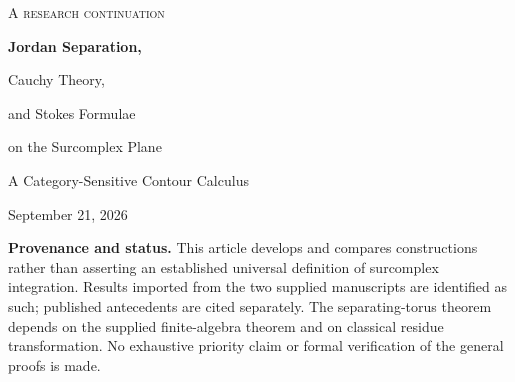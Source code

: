 \documentclass[11pt,letterpaper]{article}
\theoremstyle{definition}
\theoremstyle{remark}
\numberwithin{equation}{section}
\begin{document}
\begin{titlepage}
\centering
\vspace*{0.6cm}
{\Large\scshape A research continuation\par}
\vspace{0.65cm}
{\Huge\bfseries Jordan Separation,\par Cauchy Theory,\par and Stokes Formulae\par}
\vspace{0.35cm}
{\LARGE on the Surcomplex Plane\par}
\vspace{0.55cm}
{\Large A Category-Sensitive Contour Calculus\par}
\vspace{0.6cm}
{\large September 21, 2026\par}
\vspace{0.45cm}
\begin{minipage}{0.94\textwidth}
\begin{abstract}
There is no single surcomplex analogue of the Jordan--Cauchy--Stokes package independent of the chosen topology, function algebra, and class of integration chains. The full fine topology admits no nonconstant continuous ordinary real-parameter paths. Nevertheless, ordinary shadow topology and definable topology give two precise separation theorems; Hahn-coherent differential forms give an exact generalized Stokes theorem; and positive-support deformations give nonstandard contours with integer winding and homotopy-invariant periods.

We extend the supplied manuscripts in a more local direction as well. An infinitesimal rescaling converts radius-free Hahn analytic germs into common-domain polynomial-coefficient families. This yields microscopic Cauchy and residue formulae. Combining the supplied finite-algebra deformation theorem with classical residue transformation, we realize its multidimensional residues by explicit separating product tori, even when the original coefficient germs share no ordinary neighborhood. Rational differential forms additionally admit an algebraic period theory on semialgebraic cycles at arbitrary surreal scales. We compare these constructions with definable, Berkovich, perfectoid, $p$-adic, and resurgent integration, keeping their different hypotheses and target objects explicit.
\end{abstract}
\end{minipage}
\vfill
\begin{minipage}{0.94\textwidth}\small
\textbf{Provenance and status.} This article develops and compares constructions rather than asserting an established universal definition of surcomplex integration. Results imported from the two supplied manuscripts are identified as such; published antecedents are cited separately. The separating-torus theorem depends on the supplied finite-algebra theorem and on classical residue transformation. No exhaustive priority claim or formal verification of the general proofs is made.
\end{minipage}
\end{titlepage}
\tableofcontents
\newpage
\end{document}
